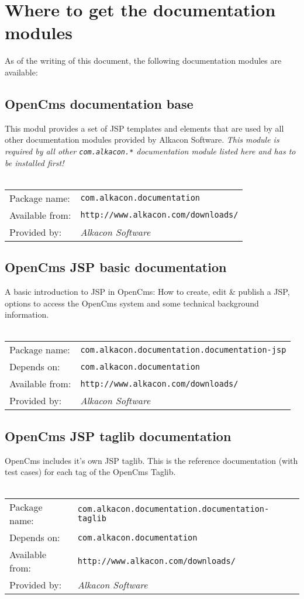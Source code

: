 \section{Where to get the documentation modules}

As of the writing of this document, the following documentation modules are available:

\subsection{OpenCms documentation base}
This modul provides a set of JSP templates and elements that are used by
all other documentation modules provided by Alkacon Software. {\em This module is required
by all other {\tt com.alkacon.*} documentation module listed here and has to be installed first!}
\\
\\
\begin{tabular}{ll}
Package name: & {\tt com.alkacon.documentation}\\
Available from: & {\tt http://www.alkacon.com/downloads/}\\
Provided by: & {\em Alkacon Software}\\
\end{tabular}

\subsection{OpenCms JSP basic documentation}
A basic introduction to JSP in OpenCms: How to create, edit \& publish a JSP, options to access 
the OpenCms system and some technical background information.
\\
\\
\begin{tabular}{ll}
Package name: & {\tt com.alkacon.documentation.documentation-jsp}\\
Depends on: & {\tt com.alkacon.documentation}\\
Available from: & {\tt http://www.alkacon.com/downloads/}\\
Provided by: & {\em Alkacon Software}\\
\end{tabular}

\subsection{OpenCms JSP taglib documentation}
OpenCms includes it's own JSP taglib. This is the reference documentation (with test cases) for 
each tag of the OpenCms Taglib.
\\
\\
\begin{tabular}{ll}
Package name: & {\tt com.alkacon.documentation.documentation-taglib}\\
Depends on: & {\tt com.alkacon.documentation}\\
Available from: & {\tt http://www.alkacon.com/downloads/}\\
Provided by: & {\em Alkacon Software}\\
\end{tabular}

